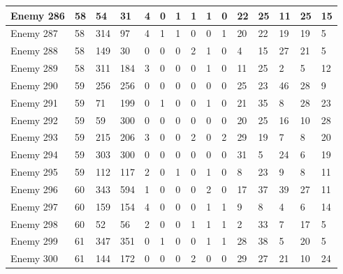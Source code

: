 \begin{sidewaystable}[!h]
{\begin{tabular}{|l|l|l|l|l|l|l|l|l|l|l|l|l|l|l|}
			Enemy 286 & 58 & 54 & 31 & 4 & 0 & 1 & 1 & 1 & 0 & 22 & 25 & 11 & 25 & 15 \\ \hline
			Enemy 287 & 58 & 314 & 97 & 4 & 1 & 1 & 0 & 0 & 1 & 20 & 22 & 19 & 19 & 5 \\ \hline
			Enemy 288 & 58 & 149 & 30 & 0 & 0 & 0 & 2 & 1 & 0 & 4 & 15 & 27 & 21 & 5 \\ \hline
			Enemy 289 & 58 & 311 & 184 & 3 & 0 & 0 & 0 & 1 & 0 & 11 & 25 & 2 & 5 & 12 \\ \hline
			Enemy 290 & 59 & 256 & 256 & 0 & 0 & 0 & 0 & 0 & 0 & 25 & 23 & 46 & 28 & 9 \\ \hline
			Enemy 291 & 59 & 71 & 199 & 0 & 1 & 0 & 0 & 1 & 0 & 21 & 35 & 8 & 28 & 23 \\ \hline
			Enemy 292 & 59 & 59 & 300 & 0 & 0 & 0 & 0 & 0 & 0 & 20 & 25 & 16 & 10 & 28 \\ \hline
			Enemy 293 & 59 & 215 & 206 & 3 & 0 & 0 & 2 & 0 & 2 & 29 & 19 & 7 & 8 & 20 \\ \hline
			Enemy 294 & 59 & 303 & 300 & 0 & 0 & 0 & 0 & 0 & 0 & 31 & 5 & 24 & 6 & 19 \\ \hline
			Enemy 295 & 59 & 112 & 117 & 2 & 0 & 1 & 0 & 1 & 0 & 8 & 23 & 9 & 8 & 11 \\ \hline
			Enemy 296 & 60 & 343 & 594 & 1 & 0 & 0 & 0 & 2 & 0 & 17 & 37 & 39 & 27 & 11 \\ \hline
			Enemy 297 & 60 & 159 & 154 & 4 & 0 & 0 & 0 & 1 & 1 & 9 & 8 & 4 & 6 & 14 \\ \hline
			Enemy 298 & 60 & 52 & 56 & 2 & 0 & 0 & 1 & 1 & 1 & 2 & 33 & 7 & 17 & 5 \\ \hline
			Enemy 299 & 61 & 347 & 351 & 0 & 1 & 0 & 0 & 1 & 1 & 28 & 38 & 5 & 20 & 5 \\ \hline
			Enemy 300 & 61 & 144 & 172 & 0 & 0 & 0 & 2 & 0 & 0 & 29 & 27 & 21 & 10 & 24 \\ \hline
		\end{tabular}%
	}
\end{sidewaystable}
\clearpage


